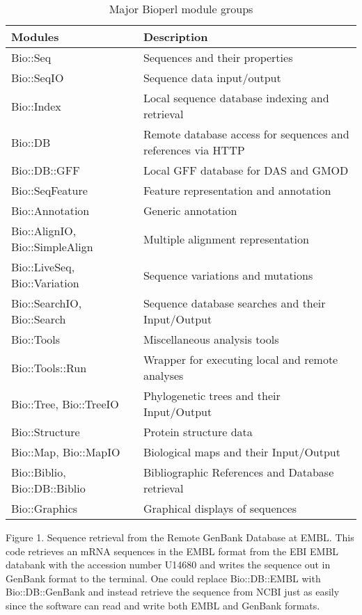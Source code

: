 \documentclass[12pt]{article}
\begin{document}
\begin{table}[h]
\begin{tabular}{|l|l|}
\hline
\textbf{Modules} & \textbf{Description} \\
\hline
Bio::Seq &  Sequences and their properties \\
Bio::SeqIO & Sequence data input/output \\
Bio::Index & Local sequence database indexing and retrieval \\ 
Bio::DB & Remote database access for sequences and references via HTTP \\
Bio::DB::GFF & Local GFF database for DAS and GMOD \\
Bio::SeqFeature & Feature representation and annotation \\
Bio::Annotation & Generic annotation \\
Bio::AlignIO, Bio::SimpleAlign & Multiple alignment representation \\
Bio::LiveSeq, Bio::Variation & Sequence variations and mutations \\
Bio::SearchIO, Bio::Search  & Sequence database searches and their Input/Output \\
Bio::Tools &  Miscellaneous analysis tools \\
Bio::Tools::Run &  Wrapper for executing local and remote analyses \\
Bio::Tree, Bio::TreeIO & Phylogenetic trees and their Input/Output  \\
Bio::Structure & Protein structure data \\
Bio::Map, Bio::MapIO & Biological maps and their Input/Output \\
Bio::Biblio, Bio::DB::Biblio & Bibliographic References and Database
retrieval \\ 
Bio::Graphics & Graphical displays of sequences \\
\hline
\end{tabular}
\caption{Major Bioperl module groups}
\label{modules}
\end{table}

\newpage


Figure 1. Sequence retrieval from the Remote GenBank Database at EMBL.
This code retrieves an mRNA sequences in the EMBL format from the EBI
EMBL databank with the accession number U14680 and writes the sequence
out in GenBank format to the terminal.  One could replace Bio::DB::EMBL
with Bio::DB::GenBank and instead retrieve the sequence from NCBI just
as easily since the software can read and write both EMBL and GenBank
formats.
\end{document}
